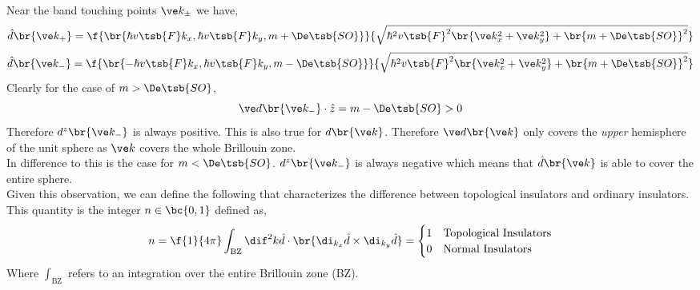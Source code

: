 \documentclass{article}
\begin{document}
Near the band touching points $\ve k_{\pm}$ we have,
\[ \hat d\br{\ve k_{+}} = \f{\br{\hbar v\tsb{F} k_x,\hbar v\tsb{F} k_y, m+\De\tsb{SO}}}{\sqrt{\hbar^2 v\tsb{F}^2 \br{\ve k_x^2 + \ve k_y^2 } + \br{m + \De\tsb{SO}}^2}} \]
\[ \hat d\br{\ve k_{-}} = \f{\br{-\hbar v\tsb{F} k_x,\hbar v\tsb{F} k_y, m-\De\tsb{SO}}}{\sqrt{\hbar^2 v\tsb{F}^2 \br{\ve k_x^2 + \ve k_y^2 } + \br{m + \De\tsb{SO}}^2}} \]
Clearly for the case of $m > \De\tsb{SO}$,
\[ \ve d\br{\ve k_{-}} \cdot \hat z = m - \De\tsb{SO} > 0 \]
Therefore $d^z\br{\ve k_{-}}$ is always positive. This is also true for $d\br{\ve k}$. Therefore $\ve d\br{\ve k}$ only covers the \textit{upper} hemisphere of the unit sphere as $\ve k$ covers the whole Brillouin zone.\\

In difference to this is the case for $m < \De\tsb{SO}$. $d^{z}\br{\ve k_{-}}$ is always negative which means that $\hat d\br{\ve k}$ is able to cover the entire sphere.\\

Given this observation, we can define the following  that characterizes the difference between topological insulators and ordinary insulators. This quantity is the integer $n \in \bc{0,1}$ defined as,
\[ n = \f{1}{4\pi} \int_{\text{BZ}} \dif^2 k \hat d\cdot \br{\di_{k_x} \hat d \times \di_{k_y} \hat d} = \begin{cases}
    1 & \text{Topological Insulators} \\
    0 & \text{Normal Insulators} \\
\end{cases} \]
Where $\int_{\text{BZ}}$ refers to an integration over the entire Brillouin zone (BZ). \\
\end{document}
